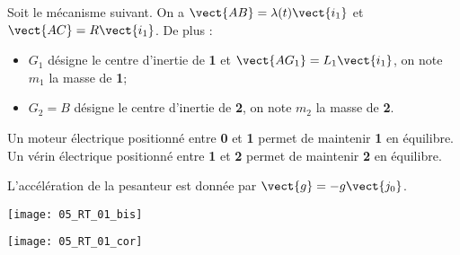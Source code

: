 \normaltrue
\correctiontrue


\setcounter{question}{0}
\ifcorrection
\else
{}
\fi

\ifprof
\else
Soit le mécanisme suivant. On a $\vect{AB}=\lambda(t)\vect{i_1}$ et $\vect{AC}=R\vect{i_1}$. De plus :
\begin{itemize}
\item $G_1$ désigne le centre d'inertie de \textbf{1} et $\vect{AG_1}=L_1\vect{i_1}$, on note $m_1$ la masse de \textbf{1}; %
\item $G_2=B$ désigne le centre d'inertie de \textbf{2}, on note $m_2$ la masse de \textbf{2}.%
\end{itemize}


Un moteur électrique positionné entre \textbf{0} et \textbf{1} permet de maintenir \textbf{1} en équilibre.
Un vérin électrique positionné entre \textbf{1} et \textbf{2} permet de maintenir \textbf{2} en équilibre.

L'accélération de la pesanteur est donnée par $\vect{g}=-g\vect{j_0}$.

\begin{center}
\texttt{[image: 05\_RT\_01\_bis]}
\end{center}
\fi

\ifprof
\begin{center}
\texttt{[image: 05\_RT\_01\_cor]}
\end{center}

\else
\fi

